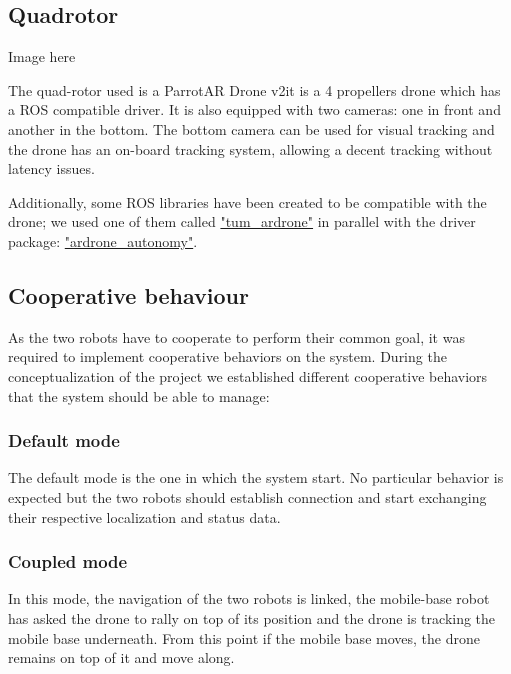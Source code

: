 \documentclass[11pt,a4paper]{article}
\begin{document}
\subsection{Quadrotor}
\begin{center}
Image here
\end{center}
The quad-rotor used is a Parrot\textcopyright AR Drone v2\texttrademark it is a 4 propellers
drone which has a ROS compatible driver. It is also equipped with two cameras: one in front
and another in the bottom. The bottom camera can be used for visual tracking and the drone
has an on-board tracking system, allowing a decent tracking without latency issues.

Additionally, some ROS libraries have been created to be compatible with the drone; we used
one of them called \href{"http://wiki.ros.org/tum_ardrone"}{"tum\_ardrone"} in parallel with
the driver package: \href{"https://github.com/AutonomyLab/ardrone_autonomy"}
{"ardrone\_autonomy"}.

\subsection{Cooperative behaviour}
As the two robots have to cooperate to perform their common goal, it was required to implement
cooperative behaviors on the system. During the conceptualization of the project we established different
cooperative behaviors that the system should be able to manage:


\subsubsection{Default mode}
The default mode is the one in which the system start. No particular behavior is expected but the two
robots should establish connection and start exchanging their respective localization and status data.

\subsubsection{Coupled mode}
In this mode, the navigation of the two robots is linked, the mobile-base robot has asked the drone to 
rally on top of its position and the drone is tracking the mobile base underneath. From this point if the mobile base moves, the drone remains on top of it and move along.
\end{document}
